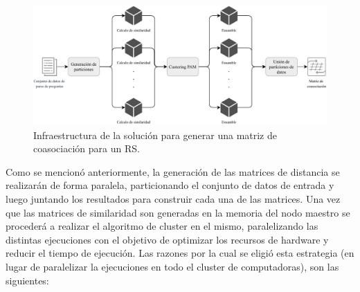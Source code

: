 \begin{figure}[h!]
	\centering
	\includegraphics[width=1\linewidth]{8_problema_investigacion/imagenes/equal_distribuido}
	\caption{Infraestructura de la solución para generar una matriz de coasociación para un RS.}
	\label{fig:equaldistribuido}
\end{figure}

\bigskip Como se mencionó anteriormente, la generación de las matrices de distancia se realizarán de forma paralela, particionando el conjunto de datos de entrada y luego juntando los resultados para construir cada una de las matrices. Una vez que las matrices de similaridad son generadas en la memoria del nodo maestro se procederá a realizar el algoritmo de cluster en el mismo, paralelizando las distintas ejecuciones con el objetivo de optimizar los recursos de hardware y reducir el tiempo de ejecución. Las razones por la cual se eligió esta estrategia (en lugar de paralelizar la ejecuciones en todo el cluster de computadoras), son las siguientes:

